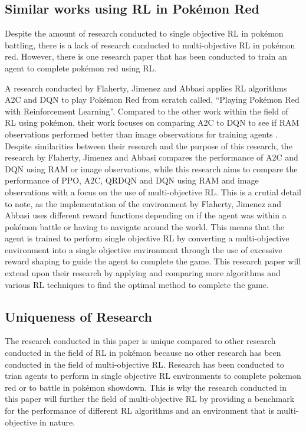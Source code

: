 \subsection{Similar works using RL in Pokémon Red}

Despite the amount of research conducted to single objective RL in pokémon battling, there is a lack of research conducted to multi-objective RL in pokémon red. However, there is one research paper that has been conducted to train an agent to complete pokémon red using RL.

A research conducted by Flaherty, Jimenez and Abbasi applies RL algorithms A2C and DQN to play Pokémon Red from scratch called, ``Playing Pokémon Red with Reinforcement Learning''\cite{flaherty2021playing}. Compared to the other work within the field of RL using pokémon, their work focuses on comparing A2C to DQN to see if RAM observations performed better than image observations for training agents \cite{flaherty2021playing}. Despite similarities between their research and the purpose of this research, the research by Flaherty, Jimenez and Abbasi compares the performance of A2C and DQN using RAM or image observations, while this research aims to compare the performance of PPO, A2C, QRDQN and DQN using RAM and image observations with a focus on the use of multi-objective RL. This is a crutial detail to note, as the implementation of the environment by Flaherty, Jimenez and Abbasi uses different reward functions depending on if the agent was within a pokémon battle or having to navigate around the world. This means that the agent is trained to perform single objective RL by converting a multi-objective environment into a single objective environment through the use of excessive reward shaping to guide the agent to complete the game. This research paper will extend upon their research by applying and comparing more algorithms and various RL techniques to find the optimal method to complete the game.

\subsection{Uniqueness of Research}

The research conducted in this paper is unique compared to other research conducted in the field of RL in pokémon because no other research has been conducted in the field of multi-objective RL. Research has been conducted to trian agents to perform in single objective RL environments to complete pokemon red or to battle in pokémon showdown. This is why the research conducted in this paper will further the field of multi-objective RL by providing a benchmark for the performance of different RL algorithms and an environment that is multi-objective in nature.